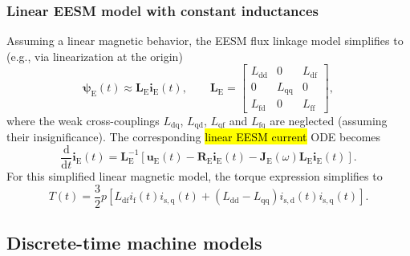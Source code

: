 \begin{frame}
    \frametitle{Linear EESM model with constant inductances}
    Assuming a linear magnetic behavior, the EESM flux linkage model simplifies to (e.g., via linearization at the origin)
    \begin{equation}
        \bm{\psi}_\mathrm{E}(t) \approx \bm{L}_{\mathrm{E}}\bm{i}_\mathrm{E}(t),
        \qquad
        \bm{L}_{\mathrm{E}} = \begin{bmatrix}
            L_{\mathrm{dd}} & 0               & L_{\mathrm{df}} \\
            0               & L_{\mathrm{qq}} & 0               \\
            L_{\mathrm{fd}} & 0               & L_{\mathrm{ff}}
        \end{bmatrix},
    \end{equation}
    where the weak cross-couplings $L_{\mathrm{dq}}$, $L_{\mathrm{qd}}$, $L_{\mathrm{qf}}$ and $L_{\mathrm{fq}}$ are neglected (assuming their insignificance). \pause
    The corresponding \hl{linear EESM current} ODE becomes
    \begin{equation}
        \frac{\mathrm{d}}{\mathrm{d}t}\bm{i}_\mathrm{E}(t) = \bm{L}_{\mathrm{E}}^{-1}\left[\bm{u}_\mathrm{E}(t) - \bm{R}_\mathrm{E}\bm{i}_\mathrm{E}(t) - \bm{J}_\mathrm{E}(\omega)\bm{L}_{\mathrm{E}}\bm{i}_\mathrm{E}(t)\right].
    \end{equation}\pause
    For this simplified linear magnetic model, the torque expression simplifies to
    \begin{equation}
        T(t) = \frac{3}{2}p\left[L_{\mathrm{df}} i_\mathrm{f}(t)i_\mathrm{s,q}(t) + (L_{\mathrm{dd}}-L_{\mathrm{qq}})i_\mathrm{s,d}(t)i_\mathrm{s,q}(t)\right].
    \end{equation}
\end{frame}


\subsection{Discrete-time machine models}

